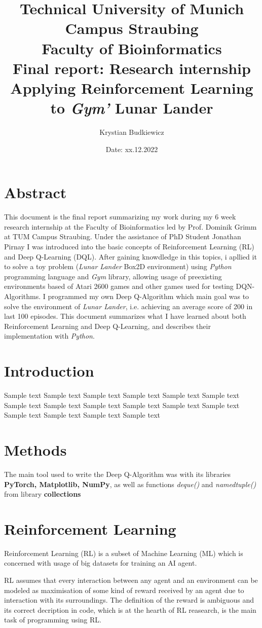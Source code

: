 \documentclass{article}
\title{
  \textbf{
    \huge \textbf{Technical University of Munich \\ Campus Straubing \\ Faculty of Bioinformatics}
      }\\
  \vspace{0,25cm}
  \huge Final report: Research internship \\ Applying Reinforcement Learning to \textit{Gym'} Lunar      Lander
  }
\author{Krystian Budkiewicz}
\date{Date: xx.12.2022}
\begin{document}
\newpage
\section*{Abstract}
This document is the final report summarizing my work during my 6 week research internship at the Faculty of Bioinformatics led by Prof. Dominik Grimm at TUM Campus Straubing. Under the assistance of PhD Student Jonathan Pirnay I was introduced into the basic concepts of Reinforcement Learning (RL) and Deep Q-Learning (DQL). After gaining knowdledge in this topics, i apllied it to solve a toy problem (\textit{Lunar Lander} Box2D environment) using \textit{Python} programming language and \textit{Gym} library, allowing usage of preexisting environments based of Atari 2600 games and other games used for testing DQN-Algorithms. I programmed my own Deep Q-Algorithm which main goal was to solve the environment of \textit{Lunar Lander}, i.e. achieving an average score of 200 in last 100 episodes. This document summarizes what I have learned about both Reinforcement Learning and Deep Q-Learning, and describes their implementation with \textit{Python}.

\newpage
\section*{Introduction}
Sample text Sample text Sample text Sample text Sample text Sample text Sample text Sample text
Sample text Sample text Sample text Sample text Sample text Sample text Sample text Sample text
\\

\section*{Methods}
The main tool used to write the Deep Q-Algorithm was  with its libraries \textbf{PyTorch, Matplotlib, NumPy}, as well as functions \textit{deque()} and \textit{namedtuple()} from library \textbf{collections}
\pagebreak

\section{Reinforcement Learning}
Reinforcement Learning (RL) is a subset of Machine Learning (ML) which is concerned with usage of big datasets for training an AI agent.

RL assumes that every interaction between any agent and an environment can be modeled as maximisation of some kind of reward received by an agent due to interaction with its surroundings. The definition of the reward is ambiguous and its correct decription in code, which is at the hearth of RL reasearch, is the main task of programming using RL.
\end{document}
